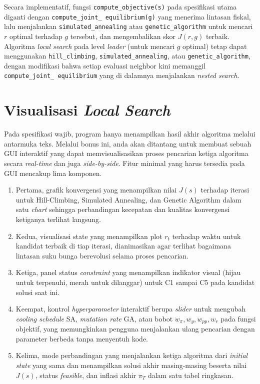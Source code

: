 Secara implementatif, fungsi \texttt{compute\_objective(s)} pada spesifikasi utama diganti dengan \texttt{compute\_joint\_ equilibrium(g)} yang menerima lintasan fiskal, lalu menjalankan \texttt{simulated\_annealing} atau \texttt{genetic\_algorithm} untuk mencari $r$ optimal terhadap $g$ tersebut, dan mengembalikan skor $J(r, g)$ terbaik. Algoritma \textit{local search} pada level \textit{leader} (untuk mencari $g$ optimal) tetap dapat menggunakan \texttt{hill\_climbing}, \texttt{simulated\_annealing}, atau \texttt{genetic\_algorithm}, dengan modifikasi bahwa setiap evaluasi neighbor kini memanggil \texttt{compute\_joint\_ equilibrium} yang di dalamnya menjalankan \textit{nested search}.


\section{Visualisasi \textit{Local Search}}

Pada spesifikasi wajib, program hanya menampilkan hasil akhir algoritma melalui antarmuka teks. Melalui bonus ini, anda akan ditantang untuk membuat sebuah GUI interaktif yang dapat memvisualisasikan proses pencarian ketiga algoritma secara \textit{real-time} dan juga \textit{side-by-side}. Fitur minimal yang harus tersedia pada GUI mencakup lima komponen.
\begin{enumerate}
    \item Pertama, grafik konvergensi yang menampilkan nilai $J(s)$ terhadap iterasi untuk Hill-Climbing, Simulated Annealing, dan Genetic Algorithm dalam satu \textit{chart} sehingga perbandingan kecepatan dan kualitas konvergensi ketiganya terlihat langsung.
    \item Kedua, visualisasi state yang menampilkan plot $r_t$ terhadap waktu untuk kandidat terbaik di tiap iterasi, dianimasikan agar terlihat bagaimana lintasan suku bunga berevolusi selama proses pencarian.
    \item Ketiga, panel status \textit{constraint} yang menampilkan indikator visual (hijau untuk terpenuhi, merah untuk dilanggar) untuk C1 sampai C5 pada kandidat solusi saat ini.
    \item  Keempat, kontrol \textit{hyperparameter} interaktif berupa \textit{slider} untuk mengubah \textit{cooling schedule} SA, \textit{mutation rate} GA, atau bobot $w_\pi, w_y, w_{pp}, w_r$ pada fungsi objektif, yang memungkinkan pengguna menjalankan ulang pencarian dengan parameter berbeda tanpa menyentuh kode.
    \item Kelima, mode perbandingan yang menjalankan ketiga algoritma dari \textit{initial state} yang sama dan menampilkan solusi akhir masing-masing beserta nilai $J(s)$, status \textit{feasible}, dan inflasi akhir $\pi_T$ dalam satu tabel ringkasan.
\end{enumerate}


